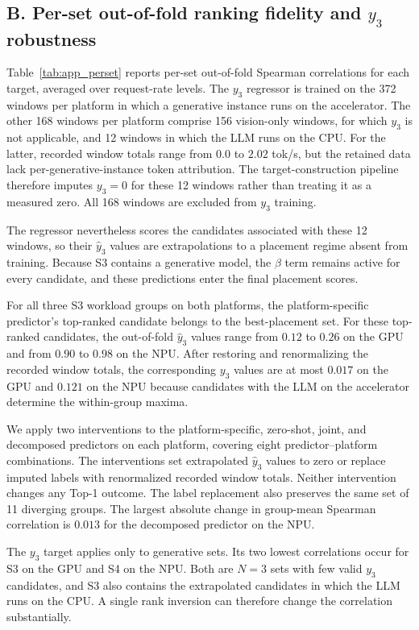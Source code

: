 \documentclass{article}
\begin{document}
\subsection*{B. Per-set out-of-fold ranking fidelity and $y_3$ robustness}
Table~\ref{tab:app_perset} reports per-set out-of-fold Spearman correlations for each target, averaged over request-rate levels. The $y_3$ regressor is trained on the 372 windows per platform in which a generative instance runs on the accelerator. The other 168 windows per platform comprise 156 vision-only windows, for which $y_3$ is not applicable, and 12 windows in which the LLM runs on the CPU. For the latter, recorded window totals range from $0.0$ to $2.02$ tok/s, but the retained data lack per-generative-instance token attribution. The target-construction pipeline therefore imputes $y_3{=}0$ for these 12 windows rather than treating it as a measured zero. All 168 windows are excluded from $y_3$ training.

The regressor nevertheless scores the candidates associated with these 12 windows, so their $\hat{y}_3$ values are extrapolations to a placement regime absent from training. Because S3 contains a generative model, the $\beta$ term remains active for every candidate, and these predictions enter the final placement scores.

For all three S3 workload groups on both platforms, the platform-specific predictor's top-ranked candidate belongs to the best-placement set. For these top-ranked candidates, the out-of-fold $\hat{y}_3$ values range from $0.12$ to $0.26$ on the GPU and from $0.90$ to $0.98$ on the NPU. After restoring and renormalizing the recorded window totals, the corresponding $y_3$ values are at most $0.017$ on the GPU and $0.121$ on the NPU because candidates with the LLM on the accelerator determine the within-group maxima.

We apply two interventions to the platform-specific, zero-shot, joint, and decomposed predictors on each platform, covering eight predictor--platform combinations. The interventions set extrapolated $\hat{y}_3$ values to zero or replace imputed labels with renormalized recorded window totals. Neither intervention changes any Top-1 outcome. The label replacement also preserves the same set of 11 diverging groups. The largest absolute change in group-mean Spearman correlation is $0.013$ for the decomposed predictor on the NPU.

The $y_3$ target applies only to generative sets. Its two lowest correlations occur for S3 on the GPU and S4 on the NPU. Both are $N{=}3$ sets with few valid $y_3$ candidates, and S3 also contains the extrapolated candidates in which the LLM runs on the CPU. A single rank inversion can therefore change the correlation substantially.
\end{document}
